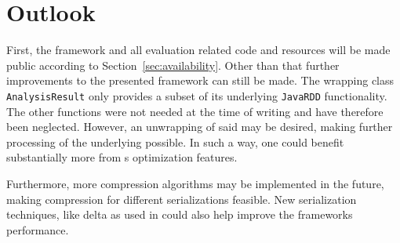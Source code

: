 \section{Outlook}
First, the framework and all evaluation related code and resources will be made public according to Section~\ref{sec:availability}. Other than that further improvements to the presented framework can still be made. The wrapping class \lstinline|AnalysisResult| only provides a subset of its underlying \lstinline|JavaRDD| functionality. The other functions were not needed at the time of writing and have therefore been neglected. However, an unwrapping of said \rdd{} may be desired, making further processing of the underlying \cas{} possible. In such a way, one could benefit substantially more from \spark{}s optimization features.

Furthermore, more compression algorithms may be implemented in the future, making compression for different serializations feasible. New serialization techniques, like delta \cas{} as used in \cite{epstein2012making} could also help improve the frameworks performance.